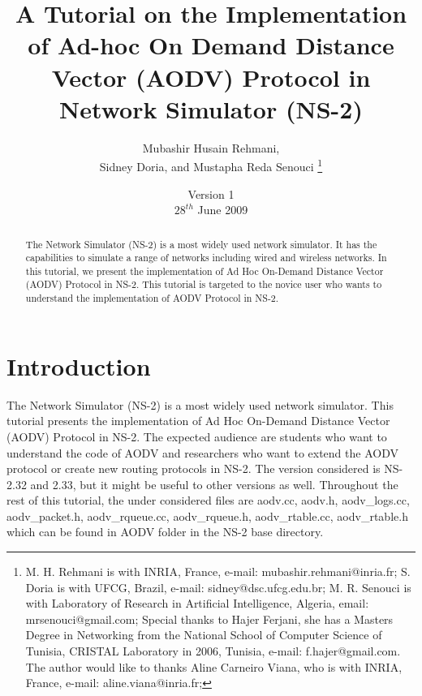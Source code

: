 \documentclass[times,10pt,onecolumn]{article}
\begin{document}
\title{A Tutorial on the Implementation of Ad-hoc On Demand Distance Vector (AODV) Protocol in Network Simulator (NS-2)\vspace{50pt}}

\author{Mubashir Husain Rehmani, \\ Sidney Doria, and Mustapha Reda Senouci \vspace{170pt} \thanks{M. H. Rehmani is with INRIA, France, e-mail: mubashir.rehmani@inria.fr; S. Doria is with UFCG, Brazil, e-mail: sidney@dsc.ufcg.edu.br; M. R. Senouci is with Laboratory of Research in Artificial Intelligence, Algeria, email: mrsenouci@gmail.com; Special thanks to Hajer Ferjani, she has a Masters Degree in Networking from the National School of Computer Science of Tunisia, CRISTAL Laboratory in 2006, Tunisia, e-mail: 
f.hajer@gmail.com. The author would like to thanks Aline Carneiro Viana, who is with INRIA, France, e-mail: aline.viana@inria.fr;} }

\date{Version 1 \vspace{55pt} \\ $28^{th}$ June 2009}

\maketitle
\pagebreak
\thispagestyle{plain}

\tableofcontents
\pagebreak

\begin{abstract}
The Network Simulator (NS-2) is a most widely used network simulator. It has the capabilities to simulate a range of networks including wired and wireless networks. In this tutorial, we present the implementation of Ad Hoc On-Demand Distance Vector (AODV) Protocol in NS-2. This tutorial is targeted to the novice user who wants to understand the implementation of AODV Protocol in NS-2.
\end{abstract}



\section{Introduction}
\label{sec:introduction}

The Network Simulator (NS-2) \cite{IEEEhowto:ns} is a most widely used network simulator. This tutorial presents the implementation of Ad Hoc On-Demand Distance Vector (AODV) Protocol \cite{IEEEhowto:aodv} in NS-2. The expected audience are students who want to understand the code of AODV and researchers who want to extend the AODV protocol or create new routing protocols in NS-2. The version considered is NS-2.32 and 2.33, but it might be useful to other versions as well. Throughout the rest of this tutorial, the under considered files are aodv.cc, aodv.h, aodv\_logs.cc, aodv\_packet.h, aodv\_rqueue.cc, aodv\_rqueue.h, aodv\_rtable.cc, aodv\_rtable.h which can be found in AODV folder in the NS-2 base directory.
\end{document}
